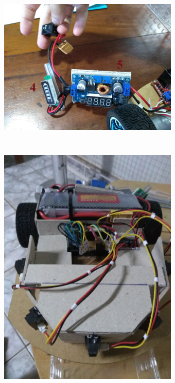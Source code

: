 \begin{figure}[!ht]
	\begin{subfigure}[b]{0.49\textwidth}%
		\centering
		\includegraphics[trim= 0cm 0cm 0cm 0cm,clip,
scale=0.02]{Figuras/RoboMontagem3}%
	\end{subfigure}%
	~
	\begin{subfigure}[b]{0.49\textwidth}%
		\centering
		\includegraphics[trim={0cm 0cm 0cm 0cm},clip,
scale=0.02]{Figuras/RoboMontagem4}%
	\end{subfigure}%
\end{figure}